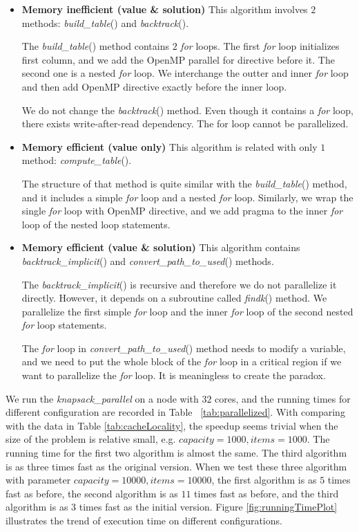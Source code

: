 \documentclass{article}[12pt]
\theoremstyle{definition}
\numberwithin{equation}{problem} %
\begin{document}
\begin{itemize}
    \item \textbf{Memory inefficient (value \& solution) }
    This algorithm involves $2$ methods: \textit{build\_table}() and \textit{backtrack}().
    
    The \textit{build\_table}() method contains $2$ \textit{for} loops. The first \textit{for} loop initializes first column, and we add the OpenMP parallel for directive before it. The second one is a nested \textit{for} loop. We interchange the outter and inner \textit{for} loop and then add OpenMP directive exactly before the inner loop.
    
    We do not change the \textit{backtrack}() method. Even though it contains a \textit{for} loop, there exists write-after-read dependency. The for loop cannot be parallelized.
    
    \item \textbf{Memory efficient (value only)}
    This algorithm is related with only $1$ method: \textit{compute\_table}(). 
    
    The structure of that method is quite similar with the \textit{build\_table}() method, and it includes a simple \textit{for} loop and a nested \textit{for} loop. Similarly, we wrap the single \textit{for} loop with OpenMP directive, and we add pragma to the inner \textit{for} loop of the nested loop statements.
    
    \item \textbf{Memory efficient (value \& solution)}
    This algorithm contains \textit{backtrack\_implicit}() and \textit{convert\_path\_to\_used}() methods.
    
    The \textit{backtrack\_implicit}() is recursive and therefore we do not parallelize it directly. However, it depends on a subroutine called \textit{findk}() method. We parallelize the first simple \textit{for} loop and the inner \textit{for} loop of the second nested \textit{for} loop statements.
    
    The \textit{for} loop in \textit{convert\_path\_to\_used}() method needs to modify a variable, and we need to put the whole block of the \textit{for} loop in a critical region if we want to parallelize the \textit{for} loop. It is meaningless to create the paradox.
    
\end{itemize}

\indent We run the \textit{knapsack\_parallel} on a node with $32$ cores, and the running times for different configuration are recorded in Table ~\ref{tab:parallelized}. With comparing with the data in Table \ref{tab:cacheLocality}, the speedup seems trivial when the size of the problem is relative small, e.g. $capacity=1000, items=1000$. The running time for the first two algorithm is almost the same. The third algorithm is as three times fast as the original version. When we test these three algorithm with parameter $capacity=10000, items=10000$, the first algorithm is as $5$ times fast as before, the second algorithm is as $11$ times fast as before, and the third algorithm is as $3$ times fast as the initial version. Figure \ref{fig:runningTimePlot} illustrates the trend of execution time on different configurations.
\end{document}
